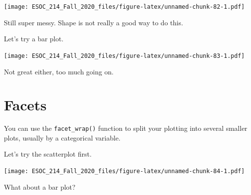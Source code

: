 \documentclass[
]{book}
\newenvironment{Shaded}{\begin{snugshade}}{\end{snugshade}}
\newcommand{\DataTypeTok}[1]{\textcolor[rgb]{0.13,0.29,0.53}{#1}}
\newcommand{\KeywordTok}[1]{\textcolor[rgb]{0.13,0.29,0.53}{\textbf{#1}}}
\newcommand{\NormalTok}[1]{#1}
\newcommand{\OperatorTok}[1]{\textcolor[rgb]{0.81,0.36,0.00}{\textbf{#1}}}
\newcommand{\StringTok}[1]{\textcolor[rgb]{0.31,0.60,0.02}{#1}}
\begin{document}
\texttt{[image: ESOC\_214\_Fall\_2020\_files/figure-latex/unnamed-chunk-82-1.pdf]}

Still super messy. Shape is not really a good way to do this.

Let's try a bar plot.

\begin{Shaded}
\end{Shaded}

\texttt{[image: ESOC\_214\_Fall\_2020\_files/figure-latex/unnamed-chunk-83-1.pdf]}

Not great either, too much going on.

\hypertarget{facets}{%
\section{Facets}\label{facets}}

You can use the \texttt{facet\_wrap()} function to split your plotting into several smaller plots, usually by a categorical variable.

Let's try the scatterplot first.

\begin{Shaded}
\end{Shaded}

\texttt{[image: ESOC\_214\_Fall\_2020\_files/figure-latex/unnamed-chunk-84-1.pdf]}

What about a bar plot?
\end{document}
